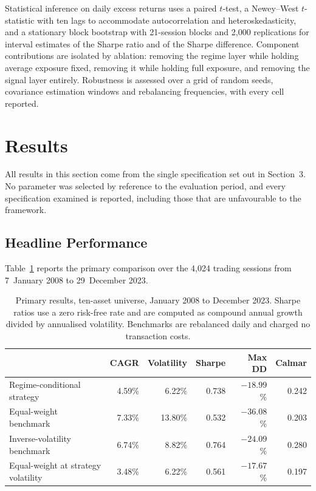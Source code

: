\documentclass{singlecol-new}
\theoremstyle{TH}{
\newtheorem{lemma}{Lemma}
\newtheorem{theorem}[lemma]{Theorem}
\newtheorem{corrolary}[lemma]{Corrolary}
\newtheorem{conjecture}[lemma]{Conjecture}
\newtheorem{proposition}[lemma]{Proposition}
\newtheorem{claim}[lemma]{Claim}
\newtheorem{stheorem}[lemma]{Wrong Theorem}
\newtheorem{algorithm}{Algorithm}
}
\theoremstyle{THrm}{
\newtheorem{definition}{Definition}[section]
\newtheorem{question}{Question}[section]
\newtheorem{remark}{Remark}
\newtheorem{scheme}{Scheme}
}
\theoremstyle{THhit}{
\newtheorem{case}{Case}[section]
}
\begin{document}
Statistical inference on daily excess returns uses a paired $t$-test, a Newey--West
$t$-statistic with ten lags to accommodate autocorrelation and heteroskedasticity, and
a stationary block bootstrap with 21-session blocks and 2{,}000 replications for
interval estimates of the Sharpe ratio and of the Sharpe difference. Component
contributions are isolated by ablation: removing the regime layer while holding average
exposure fixed, removing it while holding full exposure, and removing the signal layer
entirely. Robustness is assessed over a grid of random seeds, covariance estimation
windows and rebalancing frequencies, with every cell reported.

\section{Results}
\label{sec:results}

All results in this section come from the single specification set out in Section~3.
No parameter was selected by reference to the evaluation period, and every
specification examined is reported, including those that are unfavourable to the
framework.

\subsection{Headline Performance}

Table~\ref{tab:main} reports the primary comparison over the 4{,}024 trading sessions from
7~January 2008 to 29~December 2023.

\begin{table}[!ht]
\centering
\caption{Primary results, ten-asset universe, January 2008 to December 2023. Sharpe
ratios use a zero risk-free rate and are computed as compound annual growth divided by
annualised volatility. Benchmarks are rebalanced daily and charged no transaction costs.}
\label{tab:main}
\small
\begin{tabular}{p{4.4cm}rrrrr}
\hline
& \textbf{CAGR} & \textbf{Volatility} & \textbf{Sharpe} & \textbf{Max DD} & \textbf{Calmar} \\
\hline
Regime-conditional strategy & 4.59\% & 6.22\% & 0.738 & $-18.99$\% & 0.242 \\
Equal-weight benchmark & 7.33\% & 13.80\% & 0.532 & $-36.08$\% & 0.203 \\
Inverse-volatility benchmark & 6.74\% & 8.82\% & 0.764 & $-24.09$\% & 0.280 \\
Equal-weight at strategy volatility & 3.48\% & 6.22\% & 0.561 & $-17.67$\% & 0.197 \\
\hline
\end{tabular}
\end{table}
\end{document}
